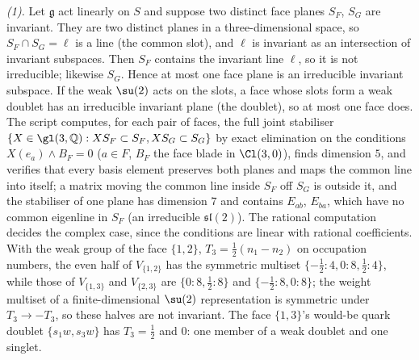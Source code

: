 \emph{(1).} Let $\mathfrak{g}$ act linearly on $S$ and suppose two distinct face planes $S_{F}$, $S_{G}$ are invariant. They are two distinct planes in a three-dimensional space, so $S_{F} \cap S_{G} = \ell$ is a line (the common slot), and $\ell$ is invariant as an intersection of invariant subspaces. Then $S_{F}$ contains the invariant line $\ell$, so it is not irreducible; likewise $S_{G}$. Hence at most one face plane is an irreducible invariant subspace. If the weak $\su(2)$ acts on the slots, a face whose slots form a weak doublet has an irreducible invariant plane (the doublet), so at most one face does. The script computes, for each pair of faces, the full joint stabiliser $\{X \in \gl(3, \mathbb{Q}) : XS_{F} \subset S_{F}, XS_{G} \subset S_{G}\}$ by exact elimination on the conditions $X(e_{a}) \wedge B_{F} = 0$ ($a \in F$, $B_{F}$ the face blade in $\Cl(3,0)$), finds dimension $5$, and verifies that every basis element preserves both planes and maps the common line into itself; a matrix moving the common line inside $S_{F}$ off $S_{G}$ is outside it, and the stabiliser of one plane has dimension $7$ and contains $E_{ab}$, $E_{ba}$, which have no common eigenline in $S_{F}$ (an irreducible $\mathfrak{sl}(2)$). The rational computation decides the complex case, since the conditions are linear with rational coefficients. With the weak group of the face $\{1,2\}$, $T_{3} = \tfrac12(n_{1} - n_{2})$ on occupation numbers, the even half of $V_{\{1,2\}}$ has the symmetric multiset $\{-\tfrac12: 4, 0: 8, \tfrac12: 4\}$, while those of $V_{\{1,3\}}$ and $V_{\{2,3\}}$ are $\{0: 8, \tfrac12: 8\}$ and $\{-\tfrac12: 8, 0: 8\}$; the weight multiset of a finite-dimensional $\su(2)$ representation is symmetric under $T_{3} \to -T_{3}$, so these halves are not invariant. The face $\{1,3\}$'s would-be quark doublet $\{s_{1}w, s_{3}w\}$ has $T_{3} = \tfrac12$ and $0$: one member of a weak doublet and one singlet.

